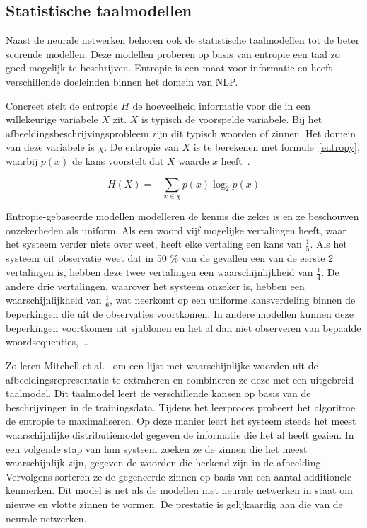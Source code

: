 \subsection{Statistische taalmodellen}
Naast de neurale netwerken behoren ook de statistische taalmodellen tot de beter scorende modellen. Deze modellen proberen op basis van entropie een taal zo goed mogelijk te beschrijven. Entropie is een maat voor informatie en heeft verschillende doeleinden binnen het domein van NLP. 

Concreet stelt de entropie $H$ de hoeveelheid informatie voor die in een willekeurige variabele $X$ zit. $X$ is typisch de voorspelde variabele. Bij het afbeeldingsbeschrijvingsprobleem zijn dit typisch woorden of zinnen. Het domein van deze variabele is $\chi$. De entropie van $X$ is te berekenen met formule~\eqref{entropy}, waarbij $p(x)$ de kans voorstelt dat $X$ waarde $x$ heeft~\cite{Jurafsky:2009:SLP:1214993}. 

\begin{equation}
     H(X) = -\sum_{x \in \chi}p(x)\log_2p(x)
     \label{entropy}
 \end{equation} 

Entropie-gebaseerde modellen modelleren de kennis die zeker is en ze beschouwen onzekerheden als uniform. Als een woord vijf mogelijke vertalingen heeft, waar het systeem verder niets over weet, heeft elke vertaling een kans van $\frac{1}{5}$. Als het systeem uit observatie weet dat in 50 \% van de gevallen een van de eerste 2 vertalingen is, hebben deze twee vertalingen een waarschijnlijkheid van $\frac{1}{4}$. De andere drie vertalingen, waarover het systeem onzeker is, hebben een waarschijnlijkheid van $\frac{1}{6}$, wat neerkomt op een uniforme kansverdeling binnen de beperkingen die uit de observaties voortkomen. In andere modellen kunnen deze beperkingen voortkomen uit sjablonen en het al dan niet observeren van bepaalde woordsequenties, \ldots~\cite{Berger1996}

Zo leren Mitchell et al.~\cite{Mitchell2015} om een lijst met waarschijnlijke woorden uit de afbeeldingsrepresentatie te extraheren en combineren ze deze met een uitgebreid taalmodel. Dit taalmodel leert de verschillende kansen op basis van de beschrijvingen in de trainingsdata. Tijdens het leerproces probeert het algoritme de entropie te maximaliseren. Op deze manier leert het systeem steeds het meest waarschijnlijke distributiemodel gegeven de informatie die het al heeft gezien. In een volgende stap van hun systeem zoeken ze de zinnen die het meest waarschijnlijk zijn, gegeven de woorden die herkend zijn in de afbeelding. Vervolgens sorteren ze de gegeneerde zinnen op basis van een aantal additionele kenmerken. Dit model is net als de modellen met neurale netwerken in staat om nieuwe en vlotte zinnen te vormen. De prestatie is gelijkaardig aan die van de neurale netwerken.

